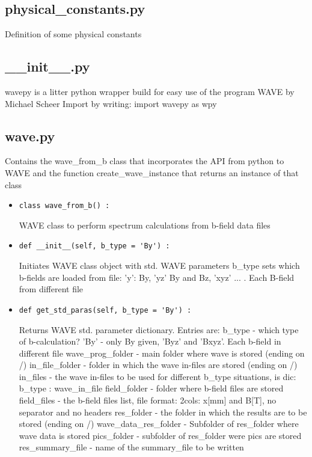 \documentclass[
12pt,%
a4paper,  %
twoside        %
]{report}
\begin{document}
\begin{landscape}
\subsection{physical\_constants.py}
Definition of some physical constants
\subsection{\_\_init\_\_.py}
wavepy is a litter python wrapper build for easy use of the program WAVE by Michael Scheer
Import by writing: import wavepy as wpy
\subsection{wave.py}
Contains the wave\_from\_b class that incorporates the API from python to WAVE and the function create\_wave\_instance that 
returns an instance of that class
\begin{itemize}
\item \begin{verbatim}
class wave_from_b() :
\end{verbatim}
WAVE class to perform spectrum calculations from b-field data files
\item \begin{verbatim}
def __init__(self, b_type = 'By') :
\end{verbatim}
Initiates WAVE class object with std. WAVE parameters
b\_type sets which b-fields are loaded from file: 'y': By,
'yz' By and Bz, 'xyz' ... . Each B-field from different file
\item \begin{verbatim}
def get_std_paras(self, b_type = 'By') :
\end{verbatim}
Returns WAVE std. parameter dictionary. Entries are:
b\_type - which type of b-calculation? 'By' - only By given, 'Byz'
and 'Bxyz'. Each b-field in different file
wave\_prog\_folder - main folder where wave is stored (ending on /)
in\_file\_folder - folder in which the wave in-files are stored (ending on /)
in\_files - the wave in-files to be used for different b\_type situations, is dic: { b\_type : wave\_in\_file }
field\_folder - folder where b-field files are stored
field\_files - the b-field files list, file format: 2cols:
 x[mm] and B[T], no separator and no headers
res\_folder - the folder in which the results are to be stored (ending on /)
wave\_data\_res\_folder - Subfolder of res\_folder where wave data is stored
pics\_folder - subfolder of res\_folder were pics are stored
res\_summary\_file - name of the summary\_file to be written

\end{itemize}
\end{landscape}
\end{document}
